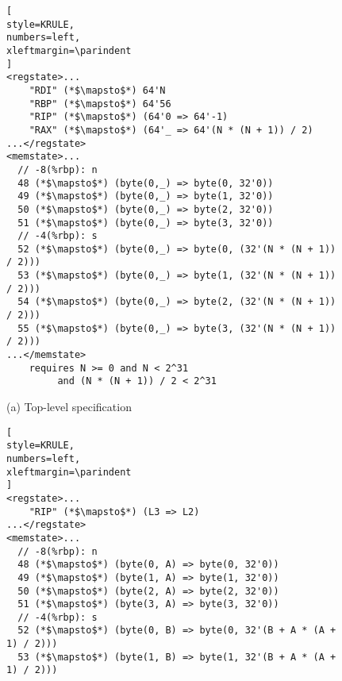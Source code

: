 

\setlength{\textfloatsep}{1\baselineskip plus 0.2\baselineskip minus 0.5\baselineskip}
\begin{figure}
\begin{lstlisting}[
style=KRULE,
numbers=left,
xleftmargin=\parindent
]
<regstate>... 
    "RDI" (*$\mapsto$*) 64'N
    "RBP" (*$\mapsto$*) 64'56
    "RIP" (*$\mapsto$*) (64'0 => 64'-1) 
    "RAX" (*$\mapsto$*) (64'_ => 64'(N * (N + 1)) / 2)
...</regstate>
<memstate>...
  // -8(%rbp): n
  48 (*$\mapsto$*) (byte(0,_) => byte(0, 32'0))
  49 (*$\mapsto$*) (byte(0,_) => byte(1, 32'0))
  50 (*$\mapsto$*) (byte(0,_) => byte(2, 32'0))
  51 (*$\mapsto$*) (byte(0,_) => byte(3, 32'0))
  // -4(%rbp): s
  52 (*$\mapsto$*) (byte(0,_) => byte(0, (32'(N * (N + 1)) / 2)))
  53 (*$\mapsto$*) (byte(0,_) => byte(1, (32'(N * (N + 1)) / 2)))
  54 (*$\mapsto$*) (byte(0,_) => byte(2, (32'(N * (N + 1)) / 2)))
  55 (*$\mapsto$*) (byte(0,_) => byte(3, (32'(N * (N + 1)) / 2)))
...</memstate>
    requires N >= 0 and N < 2^31
         and (N * (N + 1)) / 2 < 2^31
\end{lstlisting}
\begin{center}
\vspace{-5pt}
{\small (a) Top-level specification}
\vspace{-5pt}
\end{center}
\begin{lstlisting}[
style=KRULE,
numbers=left,
xleftmargin=\parindent
]
<regstate>... 
    "RIP" (*$\mapsto$*) (L3 => L2)
...</regstate>
<memstate>...
  // -8(%rbp): n
  48 (*$\mapsto$*) (byte(0, A) => byte(0, 32'0))
  49 (*$\mapsto$*) (byte(1, A) => byte(1, 32'0))
  50 (*$\mapsto$*) (byte(2, A) => byte(2, 32'0))
  51 (*$\mapsto$*) (byte(3, A) => byte(3, 32'0))
  // -4(%rbp): s
  52 (*$\mapsto$*) (byte(0, B) => byte(0, 32'(B + A * (A + 1) / 2)))
  53 (*$\mapsto$*) (byte(1, B) => byte(1, 32'(B + A * (A + 1) / 2)))

\end{lstlisting}
\end{figure}
